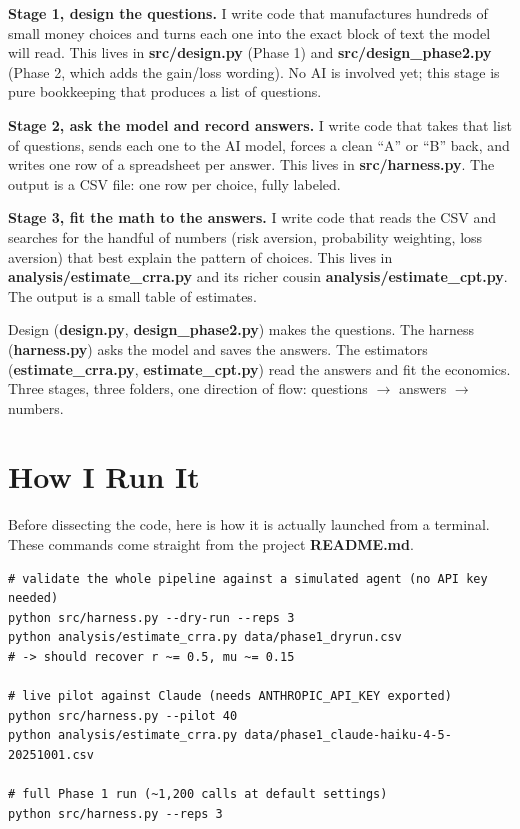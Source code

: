 \documentclass[11pt]{article}
\newcommand{\file}[1]{\textbf{\ttfamily #1}}
\begin{document}
\textbf{Stage 1, design the questions.} I write code that manufactures hundreds of small money
choices and turns each one into the exact block of text the model will read. This lives in
\file{src/design.py} (Phase 1) and \file{src/design\_phase2.py} (Phase 2, which adds the gain/loss
wording). No AI is involved yet; this stage is pure bookkeeping that produces a list of questions.

\textbf{Stage 2, ask the model and record answers.} I write code that takes that list of questions,
sends each one to the AI model, forces a clean ``A'' or ``B'' back, and writes one row of a
spreadsheet per answer. This lives in \file{src/harness.py}. The output is a CSV file: one row per
choice, fully labeled.

\textbf{Stage 3, fit the math to the answers.} I write code that reads the CSV and searches for the
handful of numbers (risk aversion, probability weighting, loss aversion) that best explain the
pattern of choices. This lives in \file{analysis/estimate\_crra.py} and its richer cousin
\file{analysis/estimate\_cpt.py}. The output is a small table of estimates.

\begin{plainbox}
Design (\file{design.py}, \file{design\_phase2.py}) makes the questions. The harness
(\file{harness.py}) asks the model and saves the answers. The estimators
(\file{estimate\_crra.py}, \file{estimate\_cpt.py}) read the answers and fit the economics. Three
stages, three folders, one direction of flow: questions $\rightarrow$ answers $\rightarrow$ numbers.
\end{plainbox}

\section{How I Run It}

Before dissecting the code, here is how it is actually launched from a terminal. These commands come
straight from the project \file{README.md}.

\begin{lstlisting}[style=sh]
# validate the whole pipeline against a simulated agent (no API key needed)
python src/harness.py --dry-run --reps 3
python analysis/estimate_crra.py data/phase1_dryrun.csv
# -> should recover r ~= 0.5, mu ~= 0.15

# live pilot against Claude (needs ANTHROPIC_API_KEY exported)
python src/harness.py --pilot 40
python analysis/estimate_crra.py data/phase1_claude-haiku-4-5-20251001.csv

# full Phase 1 run (~1,200 calls at default settings)
python src/harness.py --reps 3
\end{lstlisting}
\end{document}
